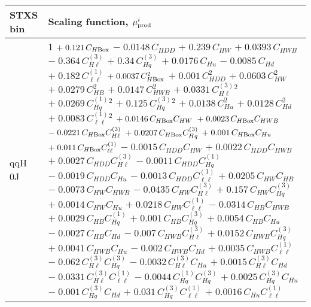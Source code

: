 \begin{tabular}{l|p{}}
    STXS bin & Scaling function, $\mu^i_{\rm{prod}}$ \\ \hline
    qqH 0J & 1 $+\;0.121\,C_{H\rm{Box}}$ $-\;0.0148\,C_{HDD}$ $+\;0.239\,C_{HW}$ $+\;0.0393\,C_{HWB}$ $-\;0.364\,C^{(3)}_{H\ell}$ $+\;0.34\,C^{(3)}_{Hq}$ $+\;0.0176\,C_{Hu}$ $-\;0.0085\,C_{Hd}$ $+\;0.182\,C^{(1)}_{\ell\ell}$ $+\;0.0037\,C_{H\rm{Box}}^{2}$ $+\;0.001\,C_{HDD}^{2}$ $+\;0.0603\,C_{HW}^{2}$ $+\;0.0279\,C_{HB}^{2}$ $+\;0.0147\,C_{HWB}^{2}$ $+\;0.0331\,C^{(3)}_{H\ell}^{2}$ $+\;0.0269\,C^{(1)}_{Hq}^{2}$ $+\;0.125\,C^{(3)}_{Hq}^{2}$ $+\;0.0138\,C_{Hu}^{2}$ $+\;0.0128\,C_{Hd}^{2}$ $+\;0.0083\,C^{(1)}_{\ell\ell}^{2}$ $+\;0.0146\,C_{H\rm{Box}}C_{HW}$ $+\;0.0023\,C_{H\rm{Box}}C_{HWB}$ $-\;0.0221\,C_{H\rm{Box}}C^{(3)}_{H\ell}$ $+\;0.0207\,C_{H\rm{Box}}C^{(3)}_{Hq}$ $+\;0.001\,C_{H\rm{Box}}C_{Hu}$ $+\;0.011\,C_{H\rm{Box}}C^{(1)}_{\ell\ell}$ $-\;0.0015\,C_{HDD}C_{HW}$ $+\;0.0022\,C_{HDD}C_{HWB}$ $+\;0.0027\,C_{HDD}C^{(3)}_{H\ell}$ $-\;0.0011\,C_{HDD}C^{(1)}_{Hq}$ $-\;0.0019\,C_{HDD}C_{Hu}$ $-\;0.0013\,C_{HDD}C^{(1)}_{\ell\ell}$ $+\;0.0205\,C_{HW}C_{HB}$ $-\;0.0073\,C_{HW}C_{HWB}$ $-\;0.0435\,C_{HW}C^{(3)}_{H\ell}$ $+\;0.157\,C_{HW}C^{(3)}_{Hq}$ $+\;0.0014\,C_{HW}C_{Hu}$ $+\;0.0218\,C_{HW}C^{(1)}_{\ell\ell}$ $-\;0.0314\,C_{HB}C_{HWB}$ $+\;0.0029\,C_{HB}C^{(1)}_{Hq}$ $+\;0.001\,C_{HB}C^{(3)}_{Hq}$ $+\;0.0054\,C_{HB}C_{Hu}$ $-\;0.0027\,C_{HB}C_{Hd}$ $-\;0.007\,C_{HWB}C^{(3)}_{H\ell}$ $+\;0.0152\,C_{HWB}C^{(3)}_{Hq}$ $+\;0.0041\,C_{HWB}C_{Hu}$ $-\;0.002\,C_{HWB}C_{Hd}$ $+\;0.0035\,C_{HWB}C^{(1)}_{\ell\ell}$ $-\;0.062\,C^{(3)}_{H\ell}C^{(3)}_{Hq}$ $-\;0.0032\,C^{(3)}_{H\ell}C_{Hu}$ $+\;0.0015\,C^{(3)}_{H\ell}C_{Hd}$ $-\;0.0331\,C^{(3)}_{H\ell}C^{(1)}_{\ell\ell}$ $-\;0.0044\,C^{(1)}_{Hq}C^{(3)}_{Hq}$ $+\;0.0025\,C^{(3)}_{Hq}C_{Hu}$ $-\;0.001\,C^{(3)}_{Hq}C_{Hd}$ $+\;0.031\,C^{(3)}_{Hq}C^{(1)}_{\ell\ell}$ $+\;0.0016\,C_{Hu}C^{(1)}_{\ell\ell}$ \\

\end{tabular}
